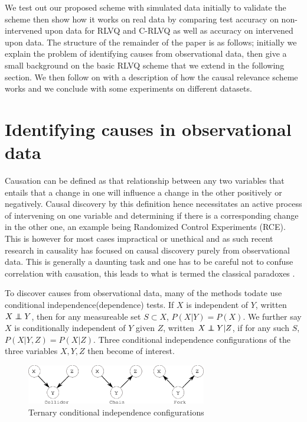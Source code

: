 \documentclass{esannV2}
\newcommand\independent{\protect\mathpalette{\protect\independenT}{\perp}}
\def\independenT#1#2{\mathrel{\rlap{$#1#2$}\mkern2mu{#1#2}}}
\def\ci{\independent}
\begin{document}
We test out our proposed scheme with simulated data initially to validate the scheme then show how it works on real data by comparing test accuracy on non-intervened upon data for RLVQ and C-RLVQ as well as accuracy on intervened upon data. The structure of the remainder of the paper is as follows; initially we explain the problem of identifying causes from observational data, then give a small background on the basic RLVQ scheme that we extend in the following section. We then follow on with a description of how the causal relevance scheme works and we conclude with some experiments on different datasets.

\section{Identifying causes in observational data}
\label{sec:IdentifyingCausesInObservationalData}

Causation can be defined as that relationship between any two variables that entails that a change in one will influence a change in the other positively or negatively. Causal discovery by this definition hence necessitates an active process of intervening on one variable and determining if there is a corresponding change in the other one, an example being Randomized Control Experiments (RCE). This is however for most cases impractical or unethical and as such recent research in causality has focused on causal discovery purely from observational data. This is generally a daunting task and one has to be careful not to confuse correlation with causation, this leads to what is termed the classical paradoxes \cite{06}.

To discover causes from observational data, many of the methods todate use conditional independence(dependence) tests. If $X$ is independent of $Y$, written $X \ci Y$, then for any measureable set $S \subset X$, $P(X|Y) = P(X)$. We further say $X$ is conditionally independent of $Y$ given $Z$, written $X \ci Y | Z$, if for any such $S$, $P(X|Y,Z) = P(X|Z)$. Three conditional independence configurations of the three variables $X,Y,Z$ then become of interest. 

\begin{figure}[!h]
	\centering
		\includegraphics[width=0.70\textwidth]{vstructure.eps}
	\caption{Ternary conditional independence configurations}
	\label{fig:vstructure}
\end{figure}
\end{document}
